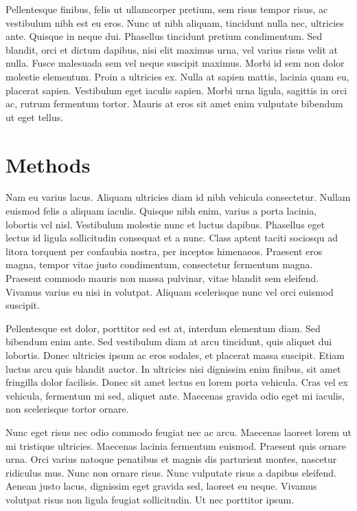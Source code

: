\documentclass{article}
\begin{document}
Pellentesque finibus, felis ut ullamcorper pretium, sem risus tempor
risus, ac vestibulum nibh est eu eros. Nunc ut nibh aliquam, tincidunt
nulla nec, ultricies ante. Quisque in neque dui. Phasellus tincidunt
pretium condimentum. Sed blandit, orci et dictum dapibus, nisi elit
maximus urna, vel varius risus velit at nulla. Fusce malesuada sem vel
neque suscipit maximus. Morbi id sem non dolor molestie elementum. Proin
a ultricies ex. Nulla at sapien mattis, lacinia quam eu, placerat
sapien. Vestibulum eget iaculis sapien. Morbi urna ligula, sagittis in
orci ac, rutrum fermentum tortor. Mauris at eros sit amet enim vulputate
bibendum ut eget tellus.

\hypertarget{methods}{%
\section{Methods}\label{methods}}

Nam eu varius lacus. Aliquam ultricies diam id nibh vehicula
consectetur. Nullam euismod felis a aliquam iaculis. Quisque nibh enim,
varius a porta lacinia, lobortis vel nisl. Vestibulum molestie nunc et
luctus dapibus. Phasellus eget lectus id ligula sollicitudin consequat
et a nunc. Class aptent taciti sociosqu ad litora torquent per confaubia
nostra, per inceptos himenaeos. Praesent eros magna, tempor vitae justo
condimentum, consectetur fermentum magna. Praesent commodo mauris non
massa pulvinar, vitae blandit sem eleifend. Vivamus varius eu nisi in
volutpat. Aliquam scelerisque nunc vel orci euismod suscipit.

Pellentesque est dolor, porttitor sed est at, interdum elementum diam.
Sed bibendum enim ante. Sed vestibulum diam at arcu tincidunt, quis
aliquet dui lobortis. Donec ultricies ipsum ac eros sodales, et placerat
massa suscipit. Etiam luctus arcu quis blandit auctor. In ultricies nisi
dignissim enim finibus, sit amet fringilla dolor facilisis. Donec sit
amet lectus eu lorem porta vehicula. Cras vel ex vehicula, fermentum mi
sed, aliquet ante. Maecenas gravida odio eget mi iaculis, non
scelerisque tortor ornare.

Nunc eget risus nec odio commodo feugiat nec ac arcu. Maecenas laoreet
lorem ut mi tristique ultricies. Maecenas lacinia fermentum euismod.
Praesent quis ornare urna. Orci varius natoque penatibus et magnis dis
parturient montes, nascetur ridiculus mus. Nunc non ornare risus. Nunc
vulputate risus a dapibus eleifend. Aenean justo lacus, dignissim eget
gravida sed, laoreet eu neque. Vivamus volutpat risus non ligula feugiat
sollicitudin. Ut nec porttitor ipsum.
\end{document}
